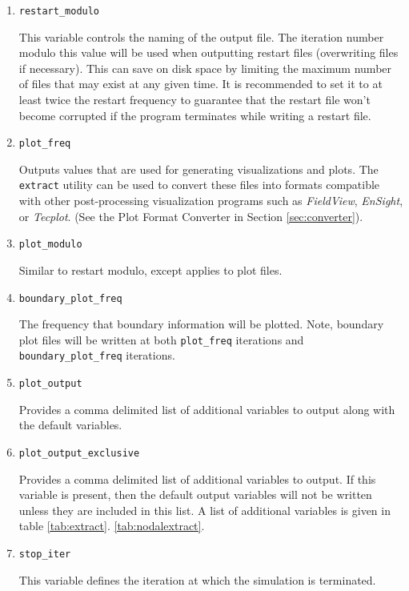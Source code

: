 \documentclass{article}
\begin{document}
\begin{enumerate}
\item {\tt restart\_modulo} 

This variable controls the naming of the output file.  The iteration
number modulo this value will be used when outputting restart files
(overwriting files if necessary).  This can save on disk space by
limiting the maximum number of files that may exist at any given time.
It is recommended to set it to at least twice the restart frequency to
guarantee that the restart file won't become corrupted if the program
terminates while writing a restart file.


\item {\tt plot\_freq}

Outputs values that are used for generating visualizations and plots.
The {\tt extract} utility can be used to convert these files into
formats compatible with other post-processing visualization programs
such as {\em FieldView}, {\em EnSight}, or {\em Tecplot}. (See the Plot Format Converter in Section
\ref{sec:converter}).

\item {\tt plot\_modulo}

Similar to restart modulo, except applies to plot files.

\item {\tt boundary\_plot\_freq}

  The frequency that boundary information will be plotted.  Note,
  boundary plot files will be written at both {\tt plot\_freq}
  iterations and {\tt boundary\_plot\_freq} iterations.

\item {\tt plot\_output}

  Provides a comma delimited list of additional variables to output
  along with the default variables.  

\item {\tt plot\_output\_exclusive}

  Provides a comma delimited list of additional variables to output.
  If this variable is present, then the default output variables will
  not be written unless they are included in this list.  A list of
  additional variables is given in table \ref{tab:extract}. %
  \ref{tab:nodalextract}.
  
\item {\tt stop\_iter}

  This variable defines the iteration at which the simulation is terminated.


\end{enumerate}
\end{document}
